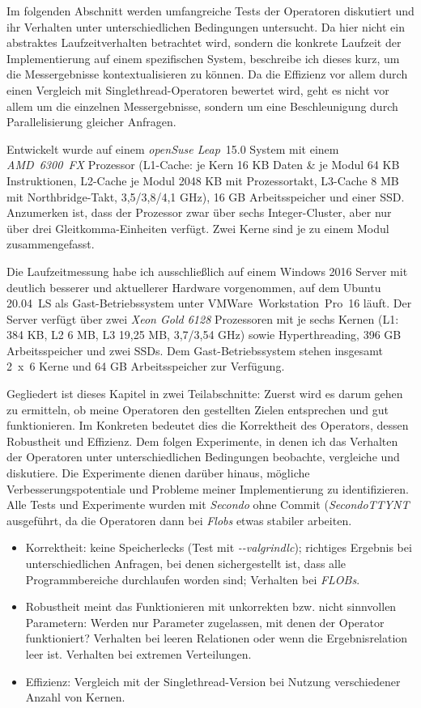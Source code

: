 \documentclass[a4paper,12pt,twoside]{article}
\newcommand{\Fb}[1]{\textit{#1}} %
\begin{document}
Im folgenden Abschnitt werden umfangreiche Tests der Operatoren diskutiert und ihr Verhalten unter unterschiedlichen Bedingungen untersucht. Da hier nicht ein abstraktes Laufzeitverhalten betrachtet wird, sondern die konkrete Laufzeit der Implementierung auf einem spezifischen System, beschreibe ich dieses kurz, um die Messergebnisse kontextualisieren zu können. Da die Effizienz vor allem durch einen Vergleich mit Singlethread-Operatoren bewertet wird, geht es nicht vor allem um die einzelnen Messergebnisse, sondern um eine Beschleunigung durch Parallelisierung gleicher Anfragen. 

Entwickelt wurde auf einem \Fb{openSuse Leap}~15.0 System mit einem \Fb{AMD~6300~FX} Prozessor (L1-Cache: je Kern 16 KB Daten \& je Modul 64 KB Instruktionen, L2-Cache je Modul 2048 KB mit Prozessortakt, L3-Cache 8 MB mit Northbridge-Takt, 3,5/3,8/4,1 GHz), 16 GB Arbeitsspeicher und einer SSD. Anzumerken ist, dass der Prozessor zwar über
sechs Integer-Cluster, aber nur über drei Gleitkomma-Einheiten verfügt. Zwei Kerne sind je zu einem Modul zusammengefasst.

Die Laufzeitmessung  habe ich ausschließlich auf einem Windows 2016 Server mit deutlich besserer und aktuellerer Hardware vorgenommen, auf dem Ubuntu 20.04~LS als Gast-Betriebssystem unter VMWare~Workstation~Pro~16 läuft. Der Server verfügt über zwei \Fb{Xeon Gold 6128} Prozessoren mit je sechs Kernen (L1: 384 KB, L2 6 MB, L3 19,25 MB, 3,7/3,54 GHz) sowie Hyperthreading, 396 GB Arbeitsspeicher und zwei SSDs. Dem Gast-Betriebssystem stehen insgesamt 2~x~6 Kerne und 64 GB Arbeitsspeicher zur Verfügung.

Gegliedert ist dieses Kapitel in zwei Teilabschnitte: Zuerst wird es darum gehen zu ermitteln, ob meine Operatoren den gestellten Zielen entsprechen und gut funktionieren. Im Konkreten bedeutet dies die Korrektheit des Operators, dessen Robustheit und Effizienz. Dem folgen Experimente, in denen ich das Verhalten der Operatoren unter unterschiedlichen Bedingungen beobachte, vergleiche und diskutiere. Die Experimente dienen darüber hinaus, mögliche Verbesserungspotentiale und Probleme meiner Implementierung zu identifizieren. Alle Tests und Experimente wurden mit \Fb{Secondo} ohne Commit (\Fb{SecondoTTYNT} ausgeführt, da die Operatoren dann bei \Fb{Flobs} etwas stabiler arbeiten. 

\begin{itemize}
	\item Korrektheit: keine Speicherlecks (Test mit \Fb{-{}-valgrindlc}); richtiges Ergebnis bei unterschiedlichen Anfragen, bei denen sichergestellt ist, dass alle Programmbereiche durchlaufen worden sind; Verhalten bei \Fb{FLOBs}.
	\item Robustheit meint das Funktionieren mit unkorrekten bzw. nicht sinnvollen Parametern: Werden nur Parameter zugelassen, mit denen der Operator funktioniert? Verhalten bei leeren Relationen oder wenn die Ergebnisrelation leer ist. Verhalten bei extremen Verteilungen.
	\item Effizienz: Vergleich mit der Singlethread-Version bei Nutzung verschiedener Anzahl von Kernen. 
\end{itemize}
\end{document}
